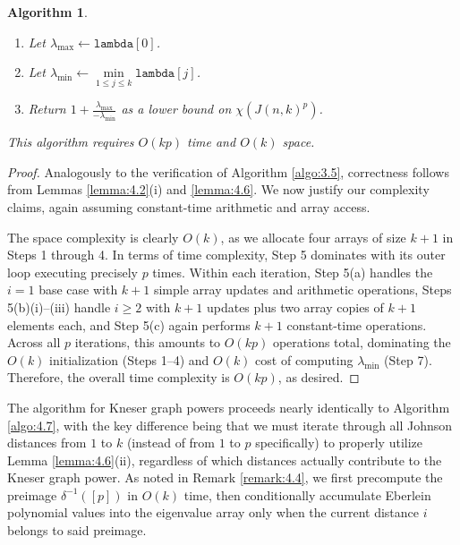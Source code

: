 \documentclass{article}
\numberwithin{equation}{section}
\theoremstyle{plain}
\newtheorem{algo}[theorem]{Algorithm}
\begin{document}
\begin{algo}
{\begin{enumerate}
\begin{enumerate}
                    \item For each $j = 0, 1, \ldots, k$:\\
                        \hspace*{\algorithmicindent}Set $\texttt{lambda}[j] \gets \texttt{lambda}[j] + \texttt{eberCurr}[j]$.
                \end{enumerate}
            \item Let $\lambda_{\text{max}} \gets \texttt{lambda}[0]$.
            \item Let $\lambda_{\text{min}} \gets \min\limits_{1 \le j \le k} \texttt{lambda}[j]$.
            \item Return $1 + \frac{\lambda_{\text{max}}}{-\lambda_{\text{min}}}$ as a lower bound on $\chi(J(n, k)^p)$.
        \end{enumerate}
    }
    This algorithm requires $O(kp)$ time and $O(k)$ space.
\end{algo}

\begin{proof}
    Analogously to the verification of Algorithm \ref{algo:3.5}, correctness follows from Lemmas \ref{lemma:4.2}(i) and \ref{lemma:4.6}. We now justify our complexity claims, again assuming constant-time arithmetic and array access.
    
    The space complexity is clearly $O(k)$, as we allocate four arrays of size $k + 1$ in Steps 1 through 4. In terms of time complexity, Step 5 dominates with its outer loop executing precisely $p$ times. Within each iteration, Step 5(a) handles the $i = 1$ base case with $k + 1$ simple array updates and arithmetic operations, Steps 5(b)(i)--(iii) handle $i \ge 2$ with $k + 1$ updates plus two array copies of $k + 1$ elements each, and Step 5(c) again performs $k + 1$ constant-time operations. Across all $p$ iterations, this amounts to $O(kp)$ operations total, dominating the $O(k)$ initialization (Steps 1--4) and $O(k)$ cost of computing $\lambda_{\text{min}}$ (Step 7). Therefore, the overall time complexity is $O(kp)$, as desired.
\end{proof}

The algorithm for Kneser graph powers proceeds nearly identically to Algorithm \ref{algo:4.7}, with the key difference being that we must iterate through all Johnson distances from $1$ to $k$ (instead of from $1$ to $p$ specifically) to properly utilize Lemma \ref{lemma:4.6}(ii), regardless of which distances actually contribute to the Kneser graph power. As noted in Remark \ref{remark:4.4}, we first precompute the preimage $\delta^{-1}([p])$ in $O(k)$ time, then conditionally accumulate Eberlein polynomial values into the eigenvalue array only when the current distance $i$ belongs to said preimage.
\end{document}
